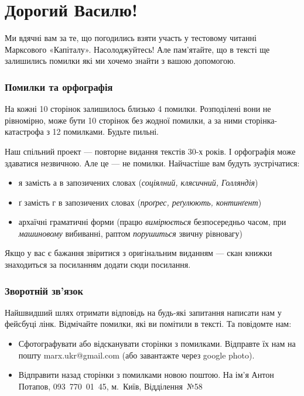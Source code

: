 \documentclass{kapital}
\begin{document}
\section*{Дорогий Василю!}
\thispagestyle{empty}

Ми вдячні вам за те, що погодились взяти участь у тестовому читанні Марксового «Капіталу».
Насолоджуйтесь! Але пам'ятайте, що в тексті ще залишились помилки які ми хочемо знайти з вашою допомогою.

\subsubsection*{Помилки та орфографія}

На кожні 10 сторінок залишилось близько 4 помилки. Розподілені вони не рівномірно, може бути 10 сторінок без жодної помилки, а за ними сторінка-катастрофа з 12 помилками. Будьте пильні.

Наш спільний проект — повторне видання текстів 30-х років. І орфографія може здаватися незвичною. Але це — не помилки. Найчастіше вам будуть зустрічатися:
\begin{itemize}
\item я замість а в запозичених словах (\emph{соціялний, клясичний, Голляндія})
\item ґ замість г в запозичених словах (\emph{проґрес, реґулюють, континґент})
\item архаїчні граматичні форми (працю \emph{вимірюється} безпосередньо часом, при \emph{машиновому} вибиванні, раптом \emph{порушиться} звичну рівновагу)
\end{itemize}

\noindent{}Якщо у вас є бажання звіритися з оригінальним виданням — скан книжки знаходиться за посиланням додати сюди посилання.

\subsubsection*{Зворотній зв'язок}

Найшвидший шлях отримати відповідь на будь-які запитання написати нам у фейсбуці лінк. Відмічайте помилки, які ви помітили в тексті. Та повідомте нам:

\begin{itemize}
\item Сфотографувати або відсканувати сторінки з помилками. Відправте їх нам на пошту marx.ukr@gmail.com (або завантажте через google photo).
\item Відправити назад сторінки з помилками новою поштою. На ім’я Антон Потапов, 093~770~01~45, м.~Київ, Відділення~№58
\end{itemize}
\end{document}
